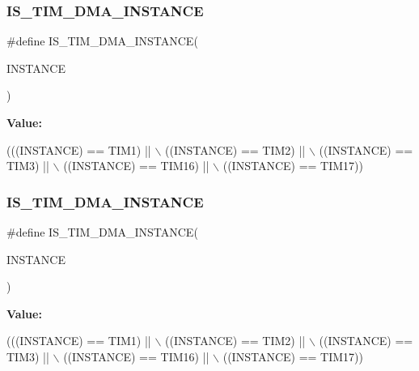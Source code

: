 \subsubsection{\texorpdfstring{I\+S\+\_\+\+T\+I\+M\+\_\+\+D\+M\+A\+\_\+\+I\+N\+S\+T\+A\+N\+CE}{IS\_TIM\_DMA\_INSTANCE}\hspace{0.1cm}{\footnotesize\ttfamily [11/16]}}
{\footnotesize\ttfamily \#define I\+S\+\_\+\+T\+I\+M\+\_\+\+D\+M\+A\+\_\+\+I\+N\+S\+T\+A\+N\+CE(\begin{DoxyParamCaption}\item[{}]{I\+N\+S\+T\+A\+N\+CE }\end{DoxyParamCaption})}

{\bfseries Value\+:}
\begin{DoxyCode}
(((INSTANCE) == TIM1)    || \(\backslash\)
   ((INSTANCE) == TIM2)    || \(\backslash\)
   ((INSTANCE) == TIM3)    || \(\backslash\)
   ((INSTANCE) == TIM16)   || \(\backslash\)
   ((INSTANCE) == TIM17))
\end{DoxyCode}
\mbox{\label{group___exported__macro_gad51d77b3bcc12a3a5c308d727b561371}} 
\subsubsection{\texorpdfstring{I\+S\+\_\+\+T\+I\+M\+\_\+\+D\+M\+A\+\_\+\+I\+N\+S\+T\+A\+N\+CE}{IS\_TIM\_DMA\_INSTANCE}\hspace{0.1cm}{\footnotesize\ttfamily [12/16]}}
{\footnotesize\ttfamily \#define I\+S\+\_\+\+T\+I\+M\+\_\+\+D\+M\+A\+\_\+\+I\+N\+S\+T\+A\+N\+CE(\begin{DoxyParamCaption}\item[{}]{I\+N\+S\+T\+A\+N\+CE }\end{DoxyParamCaption})}

{\bfseries Value\+:}
\begin{DoxyCode}
(((INSTANCE) == TIM1)    || \(\backslash\)
   ((INSTANCE) == TIM2)    || \(\backslash\)
   ((INSTANCE) == TIM3)    || \(\backslash\)
   ((INSTANCE) == TIM16)   || \(\backslash\)
   ((INSTANCE) == TIM17))
\end{DoxyCode}
\mbox{\label{group___exported__macro_gad51d77b3bcc12a3a5c308d727b561371}} 
